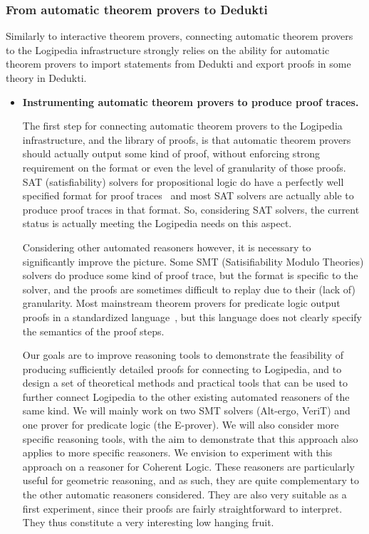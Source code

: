 \subsubsection*{From automatic theorem provers to Dedukti}

Similarly to interactive theorem provers, connecting automatic theorem
provers to the Logipedia infrastructure strongly relies on the ability
for automatic theorem provers to import statements from Dedukti and
export proofs in some theory in Dedukti.

\begin{itemize}
\item{\bf Instrumenting automatic theorem provers to produce proof traces.}

  The first step for connecting automatic theorem provers to the
Logipedia infrastructure, and the library of proofs, is that automatic
theorem provers should actually output some kind of proof, without
enforcing strong requirement on the format or even the level of
granularity of those proofs.  SAT (satisfiability) solvers for
propositional logic do have a perfectly well specified format for
proof traces~\cite{DBLP:conf/sat/WetzlerHH14} and most SAT solvers are actually able to
produce proof traces in that format.  So, considering SAT solvers, the
current status is actually meeting the Logipedia needs on this aspect.

Considering other automated reasoners however, it is necessary to
significantly improve the picture.  Some SMT (Satisifiability Modulo
Theories) solvers do produce some kind of proof trace, but the format
is specific to the solver, and the proofs are sometimes difficult to
replay due to their (lack of) granularity.  Most mainstream theorem provers for
predicate logic output proofs in a standardized language~\cite{DBLP:conf/csr/Sutcliffe07},
but this language does not clearly specify the semantics of the proof
steps.

Our goals are to improve reasoning tools to demonstrate the feasibility of
producing sufficiently detailed proofs for connecting to Logipedia, and to
design a set of theoretical methods and practical tools that can be used to
further connect Logipedia to the other existing automated reasoners of the same
kind.  We will mainly work on two SMT solvers (Alt-ergo, VeriT) and one prover
for predicate logic (the E-prover).  We will also consider more specific
reasoning tools, with the aim to demonstrate that this approach also applies to
more specific reasoners.  We envision to experiment with this approach on a
reasoner for Coherent Logic.  These reasoners are particularly useful for
geometric reasoning, and as such, they are quite complementary to the other
automatic reasoners considered.  They are also very suitable as a first
experiment, since their proofs are fairly straightforward to interpret.  They
thus constitute a very interesting low hanging fruit.


\end{itemize}
